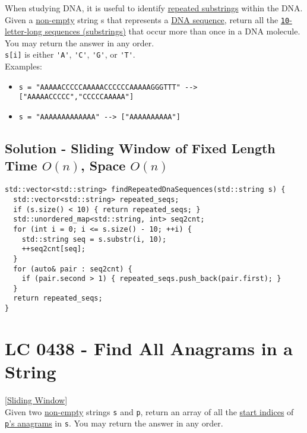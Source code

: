{When studying DNA, it is useful to identify \ul{repeated substrings} within the DNA.\\

Given a \ul{non-empty} string s that represents a \ul{DNA sequence}, return all the \ul{{\colorbox{CodeBackground}{\lstinline|10|}}-letter-long sequences (substrings)} that occur more than once in a DNA molecule. You may return the answer in any order.\\

{\colorbox{CodeBackground}{\lstinline|s[i]|}} is either {\colorbox{CodeBackground}{\lstinline|'A'|}}, {\colorbox{CodeBackground}{\lstinline|'C'|}}, {\colorbox{CodeBackground}{\lstinline|'G'|}}, or {\colorbox{CodeBackground}{\lstinline|'T'|}}.\\

Examples:
\begin{itemize}
\item {\colorbox{CodeBackground}{\lstinline|s = "AAAAACCCCCAAAAACCCCCCAAAAAGGGTTT" --> ["AAAAACCCCC","CCCCCAAAAA"]|}}
\item {\colorbox{CodeBackground}{\lstinline|s = "AAAAAAAAAAAAA" --> ["AAAAAAAAAA"]|}}
\end{itemize}

\subsection*{Solution - Sliding Window of Fixed Length {\scriptsize\color{gray}\Coffeecup\hspace{1mm}Time $O(n)$, Space $O(n)$}}
\begin{lstlisting}
std::vector<std::string> findRepeatedDnaSequences(std::string s) {
  std::vector<std::string> repeated_seqs;
  if (s.size() < 10) { return repeated_seqs; }
  std::unordered_map<std::string, int> seq2cnt;
  for (int i = 0; i <= s.size() - 10; ++i) {
    std::string seq = s.substr(i, 10);
    ++seq2cnt[seq];
  }
  for (auto& pair : seq2cnt) {
    if (pair.second > 1) { repeated_seqs.push_back(pair.first); }
  }
  return repeated_seqs;
}
\end{lstlisting}

\section{LC 0438 - Find All Anagrams in a String}\label{lc0438}
{\hyperref[sec:sliding_window]{[Sliding Window]}}\\

Given two \ul{non-empty} strings {\colorbox{CodeBackground}{\lstinline|s|}} and {\colorbox{CodeBackground}{\lstinline|p|}}, return an array of all the \ul{start indices} of \ul{{\colorbox{CodeBackground}{\lstinline|p|}}'s anagrams} in {\colorbox{CodeBackground}{\lstinline|s|}}. You may return the answer in any order.\\

}
